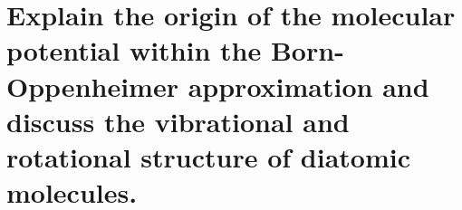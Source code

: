 \section{Explain the origin of the molecular potential within the Born-Oppenheimer approximation and discuss the vibrational and rotational structure of diatomic molecules.}

\noindent
\large

\normalsize